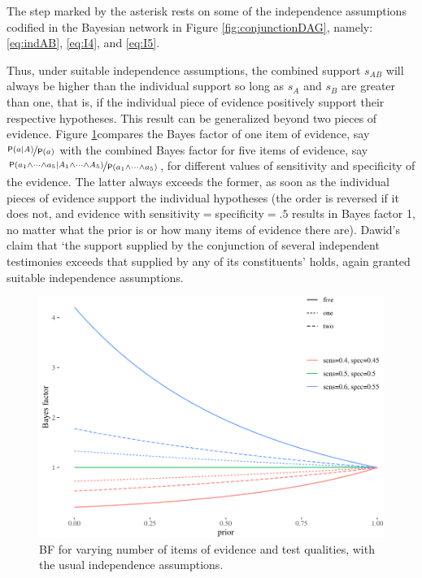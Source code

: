 \documentclass[
  10pt,
  dvipsnames,enabledeprecatedfontcommands]{scrartcl}
\newcommand{\pr}[1]{\mathsf{P}(#1)}
\begin{document}
\noindent The step marked by the asterisk rests on some of the
independence assumptions codified in the Bayesian network in Figure
\ref{fig:conjunctionDAG}, namely: \eqref{eq:indAB}, \eqref{eq:I4}, and
\eqref{eq:I5}.

\noindent  Thus, under suitable independence assumptions, the combined
support \(s_{AB}\) will always be higher than the individual support so
long as \(s_{A}\) and \(s_{B}\) are greater than one, that is, if the
individual piece of evidence positively support their respective
hypotheses. This result can be generalized beyond two pieces of
evidence. Figure \ref{fig:bfconjunction5}compares the Bayes factor of
one item of evidence, say \(\nicefrac{\pr{a \vert A}}{\pr{a}}\) with the
combined Bayes factor for five items of evidence, say
\(\nicefrac{\pr{a_1 \wedge \dots \wedge a_5 \vert A_1 \wedge \dots \wedge A_5}}{\pr{a_1\wedge \dots \wedge a_5}}\),
for different values of sensitivity and specificity of the evidence. The
latter always exceeds the former, as soon as the individual pieces of
evidence support the individual hypotheses (the order is reversed if it
does not, and evidence with sensitivity\(=\)specificity\(=.5\) results
in Bayes factor 1, no matter what the prior is or how many items of
evidence there are). Dawid's claim that `the support supplied by the
conjunction of several independent testimonies exceeds that supplied by
any of its constituents' holds, again granted suitable independence
assumptions.

\begin{figure}[h]

\begin{center}\includegraphics[width=0.9\linewidth]{conjunction-paradox_files/figure-latex/bfconjunction5-1} \end{center}
\caption{BF for varying number of items of evidence and test qualities, with the usual independence assumptions.}
\label{fig:bfconjunction5}
\end{figure}
\end{document}
